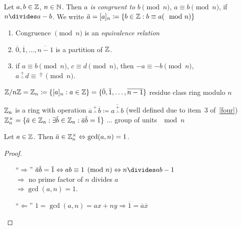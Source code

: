 \documentclass[NumTh.tex]{subfiles}
\begin{document}
\begin{defi}
Let $a,b \in \mathbb{Z}$, $n \in \mathbb{N}$. Then \emph{$a$ is congruent to $b \pmod{n}$}, $a \equiv b \pmod{n}$,
if $n\divides  a-b$.
We write $\overbar{a} = [a]_n \coloneq \{b \in \Z : b \equiv a (\mod n)\}$
\end{defi}

\begin{rem}
\label{four}
\begin{enumerate}
  \item Congruence $\pmod{n}$ is an \emph{equivalence relation}
  \item $\overbar{0},\overbar{1},\dots,\overline{n-1}$ is a partition of $\mathbb{Z}$.
  \item if $a \equiv b \pmod{n}$, $c \equiv d \pmod{n}$, then 
  $-a \equiv -b \pmod{n}$,
  $a \overset{+}{\underset{-}{\cdot}} d \equiv \overset{\pm}{\cdot} \pmod{n}$.
\end{enumerate}
\end{rem}

\begin{defi}
$\Z / n\Z = \Z_n \coloneq \{[a]_n : a\in \Z\} = \{\overbar{0},\overbar{1},\dots,\overline{n-1}\}$ residue class ring modulo $n$
\end{defi}

\begin{rem}
$\mathbb{Z}_n$ is a ring with operation $\overbar{a} \overset{+}{\underset{-}{\cdot}} \overbar{b} \coloneq \overline{a\overset{+}{\underset{-}{\cdot}}b}$ (well defined due to item~3 of~\cref{four})
$\Z_n^\times = \{ \overbar{a} \in \Z_n : \exists \overbar{b} \in \Z_n : \overbar{a}\overbar{b} = \overbar{1} \}$ ... group of units $\mod n$
\end{rem}

\begin{lemma}
Let $a \in \mathbb{Z}$. Then $\overbar{a} \in \Z_n^\times \Leftrightarrow \gcd(a,n) = 1$.
\end{lemma}

\begin{proof}\hfill
\begin{itemize}
  \item[``$\Rightarrow$'']
    $\overbar{a}\overbar{b} = \overbar{1} \Leftrightarrow ab \equiv 1 \pmod{n} \Leftrightarrow n\divides ab-1$ \\
    $\Rightarrow$ no prime factor of $n$ divides $a$ \\
    $\Rightarrow \gcd(a,n) =1$.
  \item[``$\Leftarrow$'']
    $1 = \gcd(a,n) = ax + ny \Rightarrow \overbar{1} = \overbar{a}\overbar{x}$
\end{itemize}
\end{proof}
\end{document}
